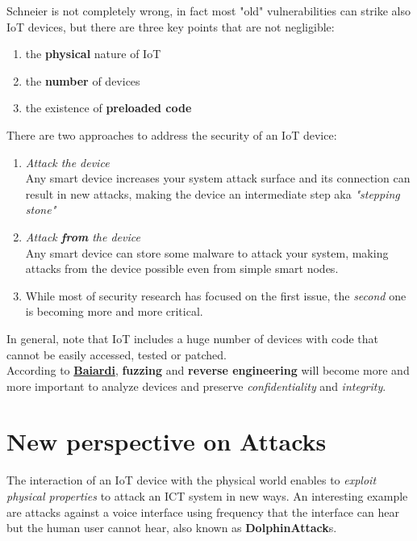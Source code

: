 Schneier is not completely wrong,
in fact most "old" vulnerabilities can strike also IoT devices, but there are three key points that are not negligible:
\begin{enumerate}
   \item the \textbf{physical} nature of IoT
   \item the \textbf{number} of devices
   \item the existence of \textbf{preloaded code}
\end{enumerate}
\nl

There are two approaches to address the security of an IoT device:
\begin{enumerate}
   \item \textit{Attack the device}\\
   Any smart device increases your system attack surface and its connection
   can result in new attacks, making the device an intermediate step aka \textit{"stepping stone"}
   \item \textit{Attack \textbf{from} the device}\\
   Any smart device can store some malware to attack your system, making attacks
   from the device possible even from simple smart nodes.
   \nl

   \item[]While most of security research has focused on the first issue, the \textit{second}
   one is becoming more and more critical.
\end{enumerate}

In general, note that IoT includes a huge number of devices with code that cannot be
easily accessed, tested or patched.\\
According to \underline{\color{red}\textbf{Baiardi}}, \textbf{fuzzing} and \textbf{reverse engineering} will become more and more important to
analyze devices and preserve \textit{confidentiality} and \textit{integrity}.

\section{New perspective on Attacks}

The interaction of an IoT device with the physical world enables to
\textit{exploit physical properties} to attack an ICT system in new ways.
An interesting example are attacks against a voice interface using frequency that the interface can hear but the human user cannot hear, also known as \textbf{DolphinAttack}s.


